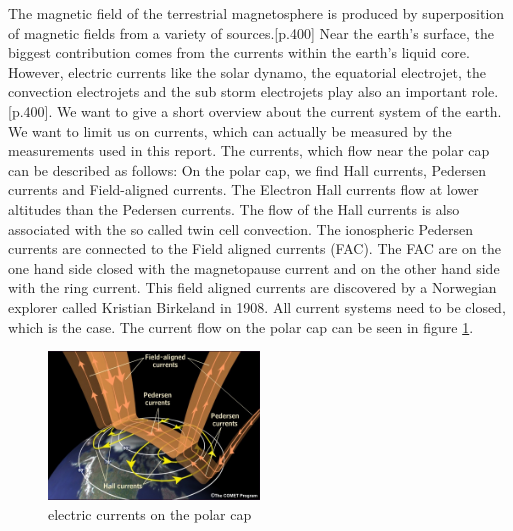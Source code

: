 \documentclass[10pt,a4paper]{article}
\begin{document}
The magnetic field of the terrestrial magnetosphere is produced by superposition of magnetic fields from a variety of sources.\cite{Buch2}[p.400]
Near the earth's surface, the biggest contribution comes from the currents within the earth's liquid core. However, electric currents like the solar dynamo, the equatorial electrojet, the convection electrojets and the sub storm electrojets play also an important role. \cite{Buch2}[p.400]. 
We want to give a short overview about the current system of the earth. We want to limit us on currents, which can actually be measured by the measurements used in this report. 
The currents, which flow near the polar cap can be described as follows:
On the polar cap, we find Hall currents, Pedersen currents and Field-aligned currents. 
The Electron Hall currents flow at lower altitudes than the Pedersen currents. The flow of the Hall currents is also associated with the so called twin cell convection.
The ionospheric Pedersen currents are connected to the Field aligned currents (FAC). The FAC are on the one hand side closed with the magnetopause current and on the other hand side with the ring current.
This field aligned currents are discovered by a Norwegian explorer called Kristian Birkeland in 1908. All current systems need to be closed, which is the case. 
The current flow on the polar cap can be seen in figure \ref{electric currents on the polar cap}.

\begin{figure}[h]
\centering
\includegraphics[width=0.5\textwidth]{polar_electric_currents.jpg}
\caption{electric currents on the polar cap\cite{Link1}}
\label{electric currents on the polar cap}
\end{figure}
\end{document}
